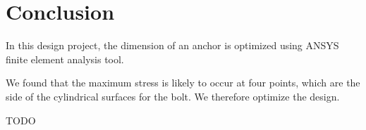 \documentclass[a4paper,14pt]{extarticle}
\begin{document}
\section{Conclusion}
In this design project, the dimension of an anchor is optimized using ANSYS finite element analysis tool. 

We found that the maximum stress is likely to occur at four points, which are the side of the cylindrical surfaces for the bolt. We therefore optimize the design.

TODO
\end{document}
